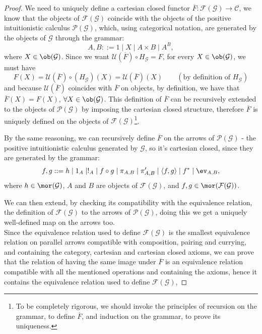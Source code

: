 \begin{proof}
    We need to uniquely define a cartesian closed functor $\overline F : \mathcal F(\mathcal G) \to \mathcal C$, we know that the objects of $\mathcal F(\mathcal G)$ coincide with the objects of the positive intuitionistic calculus $\mathcal P(\mathcal G)$,
    which, using categorical notation, are generated by the objects of $\mathcal G$ through the grammar:
    \[ A,B ::= 1 \mid X \mid A \times B \mid A^B, \]
    where $X \in \ob(\mathcal G)$. Since we want $\mathcal U(\overline F) \circ H_\mathcal G = F$, for every $X \in \ob(\mathcal G)$, we must have
    \[ F(X) = \mathcal U(\overline F)\circ (H_\mathcal G)(X) = \mathcal U(\overline F)(X)  \qquad (\text{by definition of $H_{\mathcal G}$})\]
    and because $\mathcal U(\overline F)$ coincides with $\overline F$ on objects, by definition, we have that $\overline F(X) = F(X)$, $\forall X \in \ob(\mathcal G)$.
    This definition of $\overline F$ can be recursively extended to the objects of $\mathcal P(\mathcal G)$ by imposing the cartesian closed structure, therefore $\overline F$ is uniquely defined on the objects of $\mathcal F(\mathcal G)$\footnote{To be completely rigorous, we should invoke the principles of recursion on the grammar, to define $\overline F$, and induction on the grammar, to prove its uniqueness.}.\par
    By the same reasoning, we can recursively define $\overline F$ on the arrows of $\mathcal P(\mathcal G)$ - the positive intuitionistic calculus generated by $\mathcal G$, so it's cartesian closed, since they are generated by the grammar:
    \[ f,g ::= h \mid 1_A \mid !_A \mid f \circ g \mid \pi_{A,B} \mid \pi_{A,B}' \mid \langle f,g\rangle \mid f^* \mid \ev_{A,B},\]
    where $h \in \mor(\mathcal G)$, $A$ and $B$ are objects of $\mathcal F(\mathcal G)$, and $f, g \in \mor(\mathcal F(\mathcal G))$.\par
    We can then extend, by checking its compatibility with the equivalence relation, the definition of $\mathcal F(\mathcal G)$ to the arrows of $\mathcal P(\mathcal G)$, doing this we get a uniquely well-defined map on the arrows too.\\
    Since the equivalence relation used to define $\mathcal F(\mathcal G)$ is the smallest equivalence relation on parallel arrows compatible with composition, pairing and currying, and containing the category, cartesian and cartesian closed axioms, 
    we can prove that the relation of having the same image under $\overline F$ is an equivalence relation compatible with all the mentioned operations and containing the axioms, hence it contains the equivalence relation used to define $\mathcal F(\mathcal G)$,

\end{proof}
